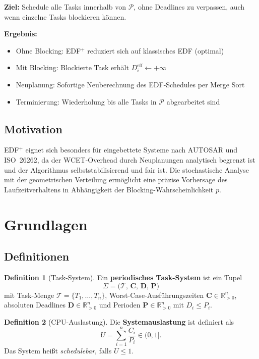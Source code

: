 ﻿\documentclass[a4paper,12pt]{article}
\theoremstyle{definition}
\newtheorem{definition}{Definition}
\begin{document}
	\textbf{Ziel:} Schedule alle Tasks innerhalb von $\mathcal{P}$, ohne Deadlines zu
	verpassen, auch wenn einzelne Tasks blockieren können.
	
	\textbf{Ergebnis:}
	\begin{itemize}
		\item Ohne Blocking: EDF$^+$ reduziert sich auf klassisches EDF (optimal)
		\item Mit Blocking: Blockierte Task erhält $D_i^{\text{eff}} \leftarrow +\infty$
		\item Neuplanung: Sofortige Neuberechnung des EDF-Schedules per Merge Sort
		\item Terminierung: Wiederholung bis alle Tasks in $\mathcal{P}$ abgearbeitet sind
	\end{itemize}
	
	\subsection{Motivation}
	
	EDF$^+$ eignet sich besonders für eingebettete Systeme nach AUTOSAR und
	ISO~26262, da der WCET-Overhead durch Neuplanungen analytisch begrenzt ist
	und der Algorithmus selbststabilisierend und fair ist. Die stochastische
	Analyse mit der geometrischen Verteilung ermöglicht eine präzise Vorhersage
	des Laufzeitverhaltens in Abhängigkeit der Blocking-Wahrscheinlichkeit $p$.
	
	\section{Grundlagen}
	
	\subsection{Definitionen}
	
	\begin{definition}[Task-System]
		Ein \textbf{periodisches Task-System} ist ein Tupel
		\[
		\Sigma = \bigl(\mathcal{T},\, \mathbf{C},\, \mathbf{D},\, \mathbf{P}\bigr)
		\]
		mit Task-Menge $\mathcal{T} = \{T_1,\ldots,T_n\}$, Worst-Case-Ausführungszeiten
		$\mathbf{C} \in \mathbb{R}_{>0}^n$, absoluten Deadlines $\mathbf{D} \in \mathbb{R}_{>0}^n$
		und Perioden $\mathbf{P} \in \mathbb{R}_{>0}^n$ mit $D_i \le P_i$.
	\end{definition}
	
	\begin{definition}[CPU-Auslastung]
		Die \textbf{Systemauslastung} ist definiert als
		\[
		U = \sum_{i=1}^{n} \frac{C_i}{P_i} \in (0, 1].
		\]
		Das System hei\ss{}t \emph{schedulebar}, falls $U \le 1$.
	\end{definition}
	
\end{document}
